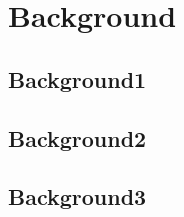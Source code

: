 \chapter{Background}
\label{chap:background}
\thispagestyle{empty}

\section{Background1}
\label{sec:background_bg1}

\section{Background2}
\label{sec:background_bg2}

\section{Background3}
\label{sec:background_bg3}
